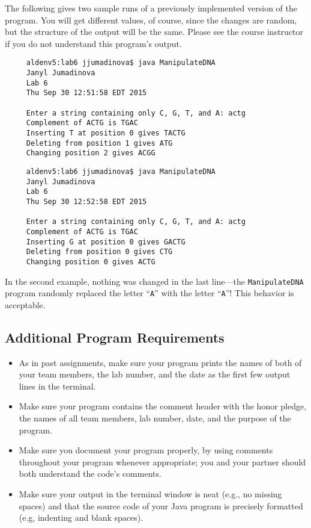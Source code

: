 The following gives two sample runs of a previously implemented version of the program. You will get different values,
of course, since the changes are random, but the structure of the output will be the same. Please see the course
instructor if you do not understand this program's output.

\begin{verbatim}
     aldenv5:lab6 jjumadinova$ java ManipulateDNA
     Janyl Jumadinova
     Lab 6
     Thu Sep 30 12:51:58 EDT 2015

     Enter a string containing only C, G, T, and A: actg
     Complement of ACTG is TGAC
     Inserting T at position 0 gives TACTG
     Deleting from position 1 gives ATG
     Changing position 2 gives ACGG
\end{verbatim}

\begin{verbatim}
     aldenv5:lab6 jjumadinova$ java ManipulateDNA
     Janyl Jumadinova
     Lab 6
     Thu Sep 30 12:52:58 EDT 2015

     Enter a string containing only C, G, T, and A: actg
     Complement of ACTG is TGAC
     Inserting G at position 0 gives GACTG
     Deleting from position 0 gives CTG
     Changing position 0 gives ACTG
\end{verbatim}

In the second example, nothing was changed in the last line---the {\tt ManipulateDNA} program randomly replaced the
letter ``{\tt A}'' with the letter ``{\tt A}''!  This behavior is acceptable.

\vspace{-0.05in}
\subsection*{Additional Program Requirements}
\vspace{-0.05in}
\begin{itemize}

\item As in past assignments, make sure your program prints the names of both of your team members, the lab number, and
  the date as the first few output lines in the terminal.

\item Make sure your program contains the comment header with the honor pledge, the names of all team members, lab
  number, date, and the purpose of the program.

\item Make sure you document your program properly, by using comments throughout your program whenever appropriate; you
  and your partner should both understand the code's comments.

\item Make sure your output in the terminal window is neat (e.g., no missing spaces) and that the source code of your
  Java program is precisely formatted (e.g, indenting and blank spaces).

\end{itemize}

